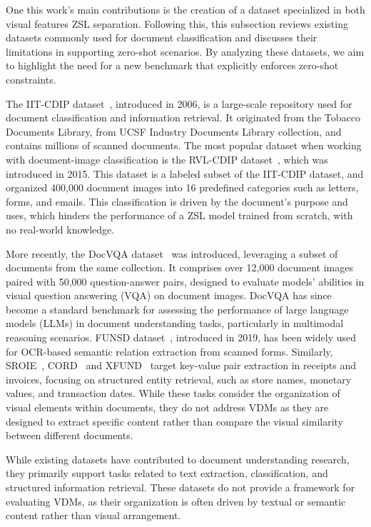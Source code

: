One this work's main contributions is the creation of a dataset specialized in both visual features ZSL separation. Following this, this subsection reviews existing datasets commonly used for document classification and discusses their limitations in supporting zero-shot scenarios. By analyzing these datasets, we aim to highlight the need for a new benchmark that explicitly enforces zero-shot constraints. 

The IIT-CDIP dataset~\cite{iitcdip2006}, introduced in 2006, is a large-scale repository used for document classification and information retrieval. It originated from the Tobacco Documents Library, from UCSF Industry Documents Library collection, and contains millions of scanned documents. The most popular dataset when working with document-image classification is the RVL-CDIP dataset~\cite{harley2015rvlcdip}, which was introduced in 2015. This dataset is a labeled subset of the IIT-CDIP dataset, and organized 400,000 document images into 16 predefined categories such as letters, forms, and emails. This classification is driven by the document's purpose and uses, which hinders the performance of a ZSL model trained from scratch, with no real-world knowledge.

More recently, the DocVQA dataset~\cite{mathew2021docvqa} was introduced, leveraging a subset of documents from the same collection. It comprises over 12,000 document images paired with 50,000 question-answer pairs, designed to evaluate models’ abilities in visual question answering (VQA) on document images. DocVQA has since become a standard benchmark for assessing the performance of large language models (LLMs) in document understanding tasks, particularly in multimodal reasoning scenarios. FUNSD dataset~\cite{funsd2019}, introduced in 2019, has been widely used for OCR-based semantic relation extraction from scanned forms. Similarly, SROIE~\cite{huang_icdar2019}, CORD~\cite{cord2019} and XFUND~\cite{xfund2021} target key-value pair extraction in receipts and invoices, focusing on structured entity retrieval, such as store names, monetary values, and transaction dates. While these tasks consider the organization of visual elements within documents, they do not address \glspl{VDM} as they are designed to extract specific content rather than compare the visual similarity between different documents.

While existing datasets have contributed to document understanding research, they primarily support tasks related to text extraction, classification, and structured information retrieval. These datasets do not provide a framework for evaluating \glspl{VDM}, as their organization is often driven by textual or semantic content rather than visual arrangement.

